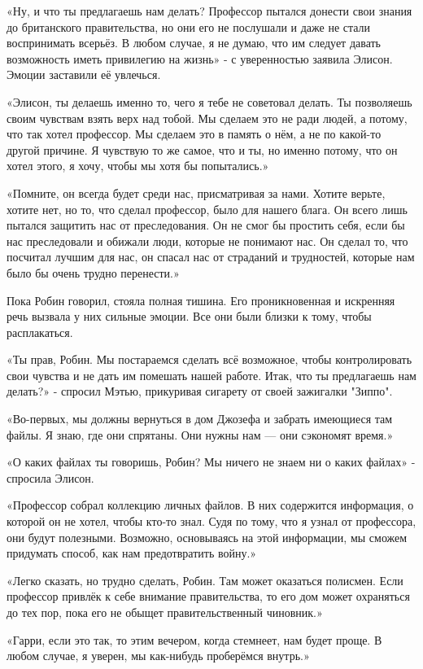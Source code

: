 \documentclass[a5paper, 9pt,
final, openany, twoside=true]{memoir}
\begin{document}
«Ну, и что ты предлагаешь нам делать? Профессор пытался донести свои знания до британского правительства, но они его не послушали и даже не стали воспринимать всерьёз. В любом случае, я не думаю, что им следует давать возможность иметь привилегию на жизнь» - с уверенностью заявила Элисон. Эмоции заставили её увлечься.

«Элисон, ты делаешь именно то, чего я тебе не советовал делать. Ты позволяешь своим чувствам взять верх над тобой. Мы сделаем это не ради людей, а потому, что так хотел профессор. Мы сделаем это в память о нём, а не по какой-то другой причине. Я чувствую то же самое, что и ты, но именно потому, что он хотел этого, я хочу, чтобы мы хотя бы попытались.»

«Помните, он всегда будет среди нас, присматривая за нами. Хотите верьте, хотите нет, но то, что сделал профессор, было для нашего блага. Он всего лишь пытался защитить нас от преследования. Он не смог бы простить себя, если бы нас преследовали и обижали люди, которые не понимают нас. Он сделал то, что посчитал лучшим для нас, он спасал нас от страданий и трудностей, которые нам было бы очень трудно перенести.»

Пока Робин говорил, стояла полная тишина. Его проникновенная и искренняя речь вызвала у них сильные эмоции. Все они были близки к тому, чтобы расплакаться.

«Ты прав, Робин. Мы постараемся сделать всё возможное, чтобы контролировать свои чувства и не дать им помешать нашей работе. Итак, что ты предлагаешь нам делать?» - спросил Мэтью, прикуривая сигарету от своей зажигалки "Зиппо".

«Во-первых, мы должны вернуться в дом Джозефа и забрать имеющиеся там файлы. Я знаю, где они спрятаны. Они нужны нам — они сэкономят время.»

«О каких файлах ты говоришь, Робин? Мы ничего не знаем ни о каких файлах» - спросила Элисон.

«Профессор собрал коллекцию личных файлов. В них содержится информация, о которой он не хотел, чтобы кто-то знал. Судя по тому, что я узнал от профессора, они будут полезными. Возможно, основываясь на этой информации, мы сможем придумать способ, как нам предотвратить войну.»

«Легко сказать, но трудно сделать, Робин. Там может оказаться полисмен. Если профессор привлёк к себе внимание правительства, то его дом может охраняться до тех пор, пока его не обыщет правительственный чиновник.»

«Гарри, если это так, то этим вечером, когда стемнеет, нам будет проще. В любом случае, я уверен, мы как-нибудь проберёмся внутрь.»
\end{document}
